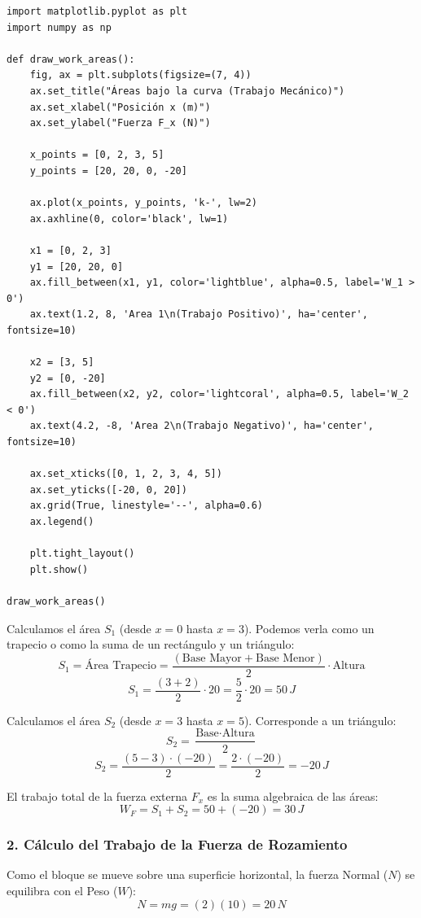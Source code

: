 \documentclass[12pt, a4paper]{article}
\begin{document}
\begin{lstlisting}
import matplotlib.pyplot as plt
import numpy as np

def draw_work_areas():
    fig, ax = plt.subplots(figsize=(7, 4))
    ax.set_title("Áreas bajo la curva (Trabajo Mecánico)")
    ax.set_xlabel("Posición x (m)")
    ax.set_ylabel("Fuerza F_x (N)")
    
    x_points = [0, 2, 3, 5]
    y_points = [20, 20, 0, -20]
    
    ax.plot(x_points, y_points, 'k-', lw=2)
    ax.axhline(0, color='black', lw=1)
    
    x1 = [0, 2, 3]
    y1 = [20, 20, 0]
    ax.fill_between(x1, y1, color='lightblue', alpha=0.5, label='W_1 > 0')
    ax.text(1.2, 8, 'Area 1\n(Trabajo Positivo)', ha='center', fontsize=10)
    
    x2 = [3, 5]
    y2 = [0, -20]
    ax.fill_between(x2, y2, color='lightcoral', alpha=0.5, label='W_2 < 0')
    ax.text(4.2, -8, 'Area 2\n(Trabajo Negativo)', ha='center', fontsize=10)
    
    ax.set_xticks([0, 1, 2, 3, 4, 5])
    ax.set_yticks([-20, 0, 20])
    ax.grid(True, linestyle='--', alpha=0.6)
    ax.legend()
    
    plt.tight_layout()
    plt.show()

draw_work_areas()
\end{lstlisting}

Calculamos el área $S_1$ (desde $x=0$ hasta $x=3$). Podemos verla como un trapecio o como la suma de un rectángulo y un triángulo:
$$ S_1 = \text{Área Trapecio} = \frac{(\text{Base Mayor} + \text{Base Menor})}{2} \cdot \text{Altura} $$
$$ S_1 = \frac{(3 + 2)}{2} \cdot 20 = \frac{5}{2} \cdot 20 = 50 \, \si{J} $$

Calculamos el área $S_2$ (desde $x=3$ hasta $x=5$). Corresponde a un triángulo:
$$ S_2 = \frac{\text{Base} \cdot \text{Altura}}{2} $$
$$ S_2 = \frac{(5 - 3) \cdot (-20)}{2} = \frac{2 \cdot (-20)}{2} = -20 \, \si{J} $$

El trabajo total de la fuerza externa $F_x$ es la suma algebraica de las áreas:
$$ W_F = S_1 + S_2 = 50 + (-20) = 30 \, \si{J} $$

\subsubsection*{2. Cálculo del Trabajo de la Fuerza de Rozamiento}
Como el bloque se mueve sobre una superficie horizontal, la fuerza Normal ($N$) se equilibra con el Peso ($W$):
$$ N = mg = (2)(10) = 20 \, \si{N} $$
\end{document}

